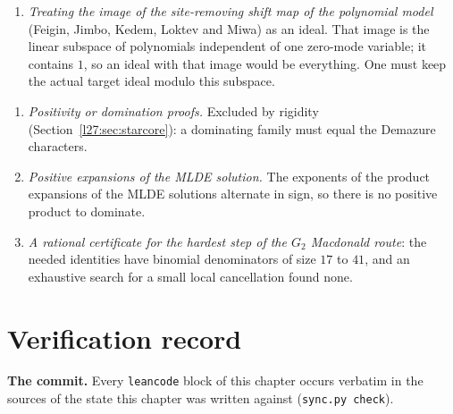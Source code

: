 \begin{warning}[title={Approaches to the total bound (Input T) that fail}]
\begin{enumerate}
  $[h_\theta,f_\theta]=-2f_\theta$ the relation $h_\theta(1)f_\theta(m-1)-f_\theta(m-1)h_\theta(1)+2f_\theta(m)=0$ has terms of filtration degree
  $0,0,1$; in the split algebra the commutator vanishes while the last term acts nontrivially. Checking only the initial forms of the
  defining generators does not prove that annihilators transfer.
\item \emph{Treating the image of the site-removing shift map of the polynomial model} (Feigin, Jimbo, Kedem, Loktev and Miwa) as an ideal.
  That image is the linear subspace of polynomials independent of one zero-mode variable; it contains $1$, so an ideal with that image
  would be everything. One must keep the actual target ideal modulo this subspace.
\end{enumerate}
\end{warning}

\begin{warning}[title={Approaches to the star bounds (Input S) that fail}]
\begin{enumerate}
\item \emph{Positivity or domination proofs.} Excluded by rigidity (Section~\ref{l27:sec:starcore}): a dominating family must equal the
  Demazure characters.
\item \emph{Positive expansions of the MLDE solution.} The exponents of the product expansions of the MLDE solutions alternate in sign, so
  there is no positive product to dominate.
\item \emph{A rational certificate for the hardest step of the $G_2$ Macdonald route}: the needed identities have binomial denominators of
  size $17$ to $41$, and an exhaustive search for a small local cancellation found none.
\end{enumerate}
\end{warning}

\section{Verification record}\label{l27:sec:verification}

\textbf{The commit.} Every \texttt{leancode} block of this chapter occurs verbatim in the sources of the state this chapter was written against
(\texttt{sync.py check}).

